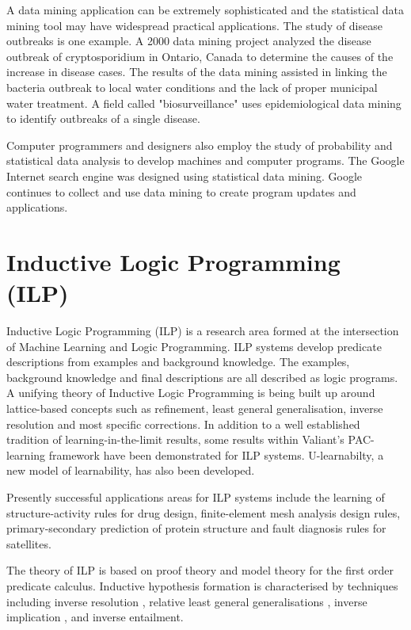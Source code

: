 \documentclass[11pt]{article} %
\begin{document}
A data mining application can be extremely sophisticated and the statistical data mining tool may have widespread practical applications. The study of disease outbreaks is one example. A 2000 data mining project analyzed the disease outbreak of cryptosporidium in Ontario, Canada to determine the causes of the increase in disease cases. The results of the data mining assisted in linking the bacteria outbreak to local water conditions and the lack of proper municipal water treatment. A field called "biosurveillance" uses epidemiological data mining to identify outbreaks of a single disease.


Computer programmers and designers also employ the study of probability and statistical data analysis to develop machines and computer programs. The Google Internet search engine was designed using statistical data mining. Google continues to collect and use data mining to create program updates and applications.



\section{Inductive Logic Programming (ILP)}

Inductive Logic Programming (ILP) is a research area formed at the intersection of Machine Learning and Logic Programming. ILP systems develop predicate descriptions from examples and background knowledge. The examples, background knowledge and final descriptions are all described as logic programs. A unifying theory of Inductive Logic Programming is being built up around lattice-based concepts such as refinement, least general generalisation, inverse resolution and most specific corrections. In addition to a well established tradition of learning-in-the-limit results, some results within Valiant's PAC-learning framework have been demonstrated for ILP systems. U-learnabilty, a new model of learnability, has also been developed.


Presently successful applications areas for ILP systems include the learning of structure-activity rules for drug design, finite-element mesh analysis design rules, primary-secondary prediction of protein structure and fault diagnosis rules for satellites.


The theory of ILP is based on proof theory and model theory for the first order predicate calculus. Inductive hypothesis formation is characterised by techniques including inverse resolution , relative least general generalisations , inverse implication , and inverse entailment.
\end{document}
